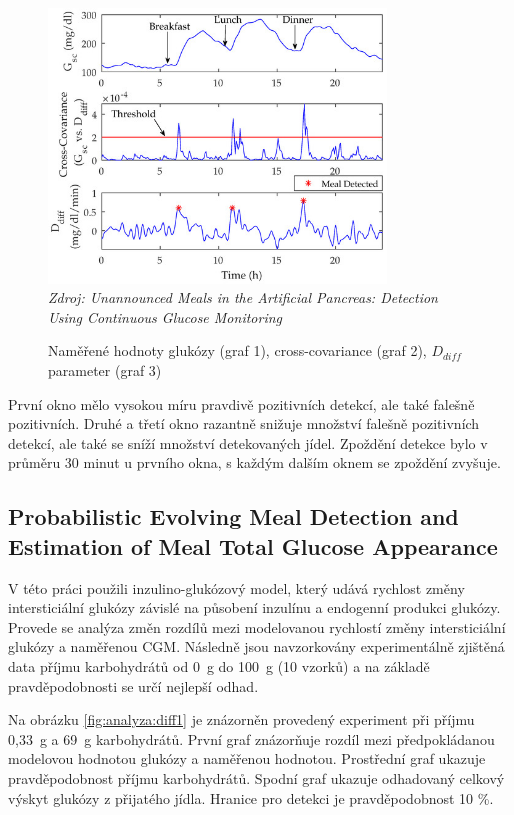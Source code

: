 \begin{figure}[H]
\caption{Naměřené hodnoty glukózy (graf 1), cross-covariance (graf 2), $D_{diff}$ parameter (graf 3)}
\label{fig:analyza:crosscovariance1}
\centering
\includegraphics[width=0.8\textwidth]{img/analyzaCHO/crosscovariance1.jpg}\\
\textit{Zdroj: Unannounced Meals in the Artificial Pancreas: Detection Using Continuous Glucose Monitoring \citep{analyzaCHO.CrossCovariance}}
\end{figure}

První okno mělo vysokou míru pravdivě pozitivních detekcí, ale také falešně pozitivních. Druhé a třetí okno razantně snižuje množství falešně pozitivních detekcí, ale také se sníží množství detekovaných jídel. Zpoždění detekce bylo v průměru 30 minut u prvního okna, s každým dalším oknem se zpoždění zvyšuje.


\subsection{Probabilistic Evolving Meal Detection and Estimation of Meal Total Glucose Appearance}
\label{ch:analyzaCHO:diff}

V této práci \citet{analyzaCHO.Diff} použili inzulino-glukózový model, který udává rychlost změny intersticiální glukózy závislé na působení inzulínu a endogenní produkci glukózy. Provede se analýza změn rozdílů mezi modelovanou rychlostí změny intersticiální glukózy a naměřenou CGM. Následně jsou navzorkovány experimentálně zjištěná data příjmu karbohydrátů od 0~g do 100~g (10 vzorků) a na základě pravděpodobnosti se určí nejlepší odhad.

Na obrázku \ref{fig:analyza:diff1} je znázorněn provedený experiment při příjmu 0,33~g a 69~g karbohydrátů. První graf znázorňuje rozdíl mezi předpokládanou modelovou hodnotou glukózy a naměřenou hodnotou. Prostřední graf ukazuje pravděpodobnost příjmu karbohydrátů. Spodní graf ukazuje odhadovaný celkový výskyt glukózy z přijatého jídla. Hranice pro detekci je pravděpodobnost 10 \%.

